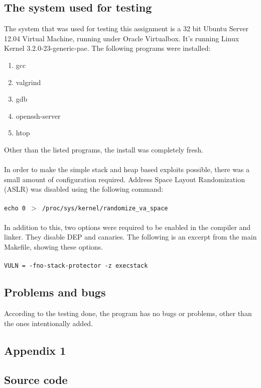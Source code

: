 \documentclass[]{article}
\begin{document}
\subsection*{The system used for testing}
The system that was used for testing this assignment is a 32 bit Ubuntu Server 12.04 Virtual Machine, running under Oracle Virtualbox. It's running Linux Kernel 3.2.0-23-generic-pae. The following programs were installed:

\begin{enumerate}
	\item gcc
	\item valgrind
	\item gdb
	\item openssh-server
	\item htop
\end{enumerate}
Other than the listed programs, the install was completely fresh. \\
\\
In order to make the simple stack and heap based exploits possible, there was a small amount of configuration required. Address Space Layout Randomization (ASLR) was disabled using the following command:\\
\\
 \texttt{echo 0 $>$ /proc/sys/kernel/randomize\_va\_space}\\
 \\
 In addition to this, two options were required to be enabled in the compiler and linker. They disable DEP and canaries. The following is an excerpt from the main Makefile, showing these options.\\
 \\
 \texttt{VULN = -fno-stack-protector -z execstack}

\subsection*{Problems and bugs}
According to the testing done, the program has no bugs or problems, other than the ones intentionally added.

\pagebreak
\begin{center}
	\section*{Appendix 1}
\end{center}
\subsection*{Source code}


\pagebreak


\pagebreak


\pagebreak




\break
\setlength\itemsep{4\itemsep}

\end{document}

